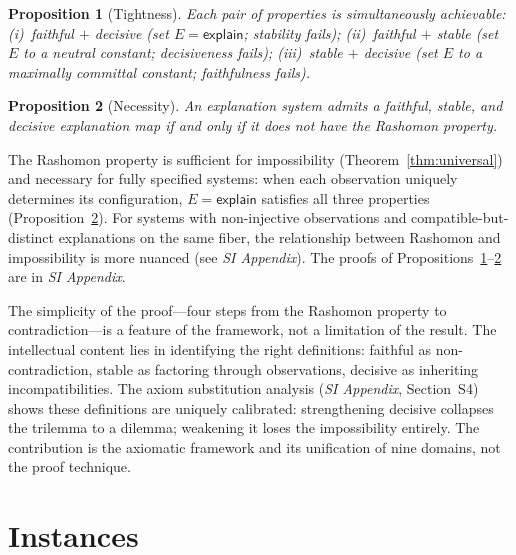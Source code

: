 \documentclass[twocolumn]{article}
\newtheorem{proposition}{Proposition}
\begin{document}
\begin{proposition}[Tightness]
\label{prop:tightness}
Each pair of properties is simultaneously achievable:
(i)~faithful $+$ decisive (set $E = \mathsf{explain}$; stability fails);
(ii)~faithful $+$ stable (set $E$ to a neutral constant; decisiveness fails);
(iii)~stable $+$ decisive (set $E$ to a maximally committal constant;
faithfulness fails).
\end{proposition}

\begin{proposition}[Necessity]
\label{prop:necessity}
An explanation system admits a faithful, stable, and decisive explanation
map if and only if it does \emph{not} have the Rashomon property.
\end{proposition}

\noindent
The Rashomon property is sufficient for impossibility (Theorem~\ref{thm:universal})
and necessary for fully specified systems: when each observation uniquely determines
its configuration, $E = \mathsf{explain}$ satisfies all three properties
(Proposition~\ref{prop:necessity}). For systems with non-injective observations
and compatible-but-distinct explanations on the same fiber, the relationship
between Rashomon and impossibility is more nuanced (see \emph{SI Appendix}).
The proofs of
Propositions~\ref{prop:tightness}--\ref{prop:necessity} are in
\emph{SI Appendix}.

The simplicity of the proof---four steps from the Rashomon property to
contradiction---is a feature of the framework, not a limitation of the
result. The intellectual content lies in identifying the right
definitions: faithful as non-contradiction, stable as factoring through
observations, decisive as inheriting incompatibilities. The axiom
substitution analysis (\emph{SI Appendix}, Section~S4) shows these
definitions are uniquely calibrated: strengthening decisive collapses the
trilemma to a dilemma; weakening it loses the impossibility entirely. The
contribution is the axiomatic framework and its unification of nine
domains, not the proof technique.



\section{Instances}
\label{sec:instances}
\end{document}
